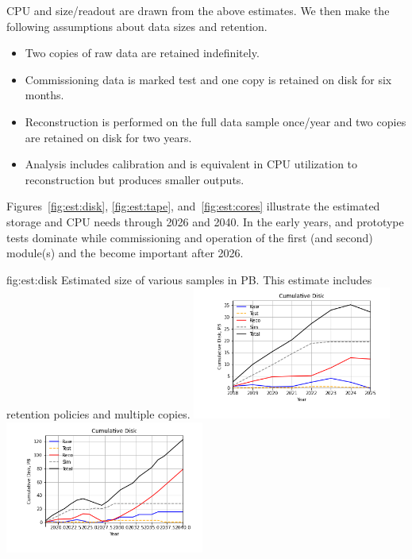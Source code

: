 \documentclass[../main-v1.tex]{subfiles}
\begin{document}
CPU and size/readout are drawn from the above estimates. We then make the following assumptions about data sizes and retention.  

\begin{itemize}
\item Two copies of raw data are retained indefinitely.
\item Commissioning data is marked test and one copy is retained on disk for six months. 
\item Reconstruction is performed on the full data sample once/year and two copies are retained on disk for two years.  
\item Analysis includes calibration and is  equivalent in CPU utilization to reconstruction but produces smaller outputs. 
\end{itemize}

Figures~\ref{fig:est:disk}, \ref{fig:est:tape}, and~\ref{fig:est:cores} illustrate the estimated storage and CPU needs through 2026 and 2040.  In the early years,  and  prototype tests dominate while commissioning and operation of the first (and second)  module(s) and the  become important after 2026. 

\begin{dunefigure}
{fig:est:disk}
{Estimated size of various samples in PB. This estimate includes retention policies and multiple copies.}
\includegraphics[width=0.49\textwidth]{graphics/IntroFigures/soon/Cumulative-Disk.png}
\includegraphics[width=0.49\textwidth]{graphics/IntroFigures/2040/Cumulative-Disk.png}
\end{dunefigure}
\end{document}
